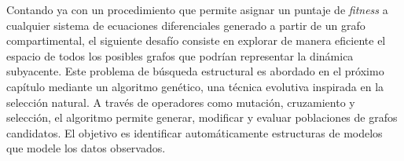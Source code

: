 Contando ya con un procedimiento que permite asignar un puntaje de \textit{fitness} a cualquier sistema de ecuaciones diferenciales generado a partir de un grafo 
compartimental, el siguiente desafío consiste en explorar de manera eficiente el espacio de todos los posibles grafos que podrían representar la dinámica subyacente. 
Este problema de búsqueda estructural es abordado en el próximo capítulo mediante un algoritmo genético, una técnica evolutiva inspirada en la selección natural. A 
través de operadores como mutación, cruzamiento y selección, el algoritmo permite generar, modificar y evaluar poblaciones de grafos candidatos. El objetivo es 
identificar automáticamente estructuras de modelos que modele los datos observados.